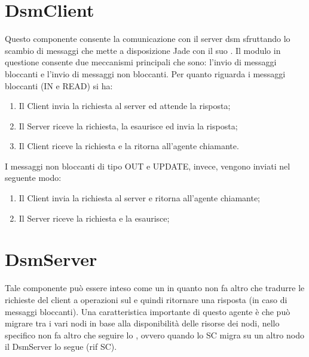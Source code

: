 \section{DsmClient}
Questo componente consente la comunicazione con il server dsm sfruttando lo scambio di messaggi che mette a disposizione Jade con il suo . Il modulo in questione consente due meccanismi principali che sono: l'invio di messaggi bloccanti e l'invio di messaggi non bloccanti. Per quanto riguarda i messaggi bloccanti (IN e READ) si ha:
\begin{enumerate}
	\item Il Client invia la richiesta al server ed attende la risposta;
	\item Il Server riceve la richiesta, la esaurisce ed invia la risposta;
	\item Il Client riceve la richiesta e la ritorna all'agente chiamante.
\end{enumerate}
I messaggi non bloccanti di tipo OUT e UPDATE, invece, vengono inviati nel seguente modo:
\begin{enumerate}
	\item Il Client invia la richiesta al server e ritorna all'agente chiamante;
	\item Il Server riceve la richiesta e la esaurisce;
\end{enumerate}
\section{DsmServer}
Tale componente può essere inteso come un  in quanto non fa altro che tradurre le richieste del client a operazioni sul  e quindi ritornare una risposta (in caso di messaggi bloccanti). Una caratteristica importante di questo agente è che può migrare tra i vari nodi in base alla disponibilità delle risorse dei nodi, nello specifico non fa altro che seguire lo , ovvero quando lo SC migra su un altro nodo il DsmServer lo segue (rif SC).